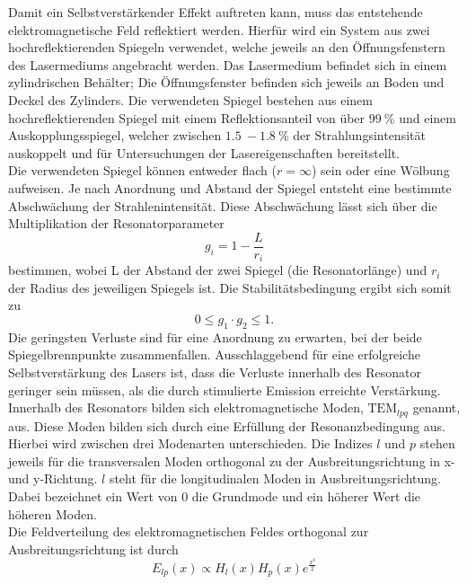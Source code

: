 Damit ein Selbstverstärkender Effekt auftreten kann, muss das entstehende elektromagnetische Feld reflektiert werden. Hierfür wird ein System aus zwei
hochreflektierenden Spiegeln verwendet, welche jeweils an den Öffnungsfenstern des Lasermediums angebracht werden. Das Lasermedium befindet sich in einem 
zylindrischen Behälter; Die Öffnungsfenster befinden sich jeweils an Boden und Deckel des Zylinders. Die verwendeten Spiegel bestehen aus einem hochreflektierenden
Spiegel mit einem Reflektionsanteil von über $\qty{99}{\%}$ und einem Auskopplungsspiegel, welcher zwischen $\qty{1.5}{}-\qty{1.8}{\%}$ der Strahlungsintensität
auskoppelt und für Untersuchungen der Lasereigenschaften bereitstellt.\\
Die verwendeten Spiegel können entweder flach ($r = \infty$) sein oder eine Wölbung aufweisen. Je nach Anordnung und Abstand der Spiegel entsteht
eine bestimmte Abschwächung der Strahlenintensität. Diese Abschwächung lässt sich über die Multiplikation der Resonatorparameter
\begin{equation}
    g_i = 1 - \frac{L}{r_i}
\end{equation}
bestimmen, wobei L der Abstand der zwei Spiegel (die Resonatorlänge) und $r_i$ der Radius des jeweiligen Spiegels ist. Die Stabilitätsbedingung ergibt sich somit zu 
\begin{equation}
    0 \leq g_1 \cdot g_2 \leq 1.
\end{equation}
Die geringsten Verluste sind für eine Anordnung zu erwarten, bei der beide Spiegelbrennpunkte zusammenfallen. Ausschlaggebend für eine erfolgreiche Selbstverstärkung
des Lasers ist, dass die Verluste innerhalb des Resonator geringer sein müssen, als die durch stimulierte Emission erreichte Verstärkung.\\
Innerhalb des Resonators bilden sich elektromagnetische Moden, $\mathrm{TEM}_{lpq}$ genannt, aus. Diese Moden bilden sich durch eine Erfüllung der Resonanzbedingung aus.
Hierbei wird zwischen drei Modenarten unterschieden. Die Indizes $l$ und $p$ stehen jeweils für die transversalen Moden orthogonal zu der Ausbreitungsrichtung in x-
und y-Richtung. $l$ steht für die longitudinalen Moden in Ausbreitungsrichtung. Dabei bezeichnet ein Wert von $0$ die Grundmode und ein höherer Wert die höheren Moden.\\
Die Feldverteilung des elektromagnetischen Feldes orthogonal zur Ausbreitungsrichtung ist durch
\begin{equation}
    E_{lp}(x) \propto H_l(x) H_p(x) e^{\frac{x^2}{2}}
\end{equation}
